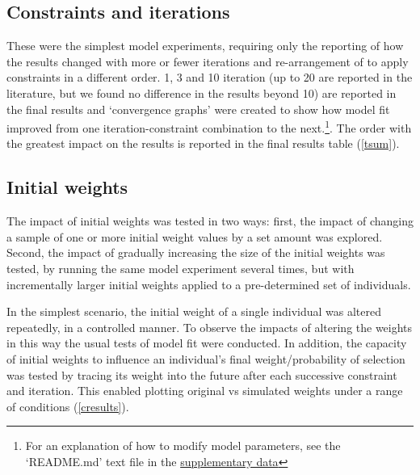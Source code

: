 \documentclass[a4paper,10pt]{article}
\begin{document}
\subsection{Constraints and iterations}
These were the simplest model experiments, requiring only
the reporting of how the results changed with more or fewer
iterations and re-arrangement of to apply constraints
in a different order. 1, 3 and 10 iteration (up to 20 are
reported in the literature, but we found no difference in the
results beyond 10) are reported in the final
results and `convergence graphs' were created to show how model
fit improved from one iteration-constraint combination to the next.\footnote{For
an explanation of how to modify model parameters, see the `README.md' text
file in the \href{http://tinyurl.com/lgw6zev}{supplementary data}}.
%
%
% 
The order with the greatest impact on the results is reported
in the final results table (\cref{tsum}).

\subsection{Initial weights}
The impact of initial weights was tested in two ways: first, the impact
of changing a sample of one or more initial weight values by a set
amount was explored. Second, the impact of gradually increasing the size of the initial 
weights was tested, by running the same model experiment several times, 
but with incrementally larger initial weights applied to a pre-determined set of individuals.

In the simplest scenario, the
initial weight of a single individual was altered 
repeatedly, in a controlled manner.
To observe the impacts of altering the weights in this way
the usual tests of model fit were conducted. In addition,
the capacity of initial weights to influence an individual's 
final weight/probability of selection was tested by tracing its
weight into the future after each successive constraint and iteration. 
This enabled plotting original vs simulated weights under a 
range of conditions (\cref{cresults}).
\end{document}
